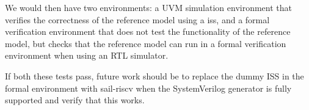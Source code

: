 We would then have two environments: a UVM simulation environment that verifies the correctness of the reference model using a \cpp \acrshort{iss}, and a formal verification environment that does not test the functionality of the reference model, but checks that the reference model can run in a formal verification environment when using an RTL simulator.

If both these tests pass, future work should be to replace the dummy ISS in the formal environment with sail-riscv when the SystemVerilog generator is fully supported and verify that this works. 



